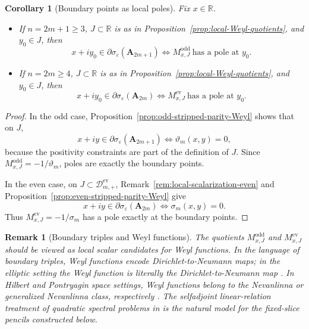 \documentclass[11pt]{article}
\newtheorem{corollary}[theorem]{Corollary}
\newtheorem{remark}[theorem]{Remark}
\begin{document}
\begin{corollary}[Boundary points as local poles]\label{cor:boundary-poles}
Fix \(x\in\mathbb{R}\).

\begin{itemize}
\item If \(n=2m+1\ge 3\), \(J\subset\mathbb R\) is as in Proposition~\ref{prop:local-Weyl-quotients},
and \(y_0\in J\), then
\[
x+iy_0\in \partial\sigma_\varepsilon(\mathbf A_{2m+1})
\iff
M^{\mathrm{odd}}_{x,J}\ \text{has a pole at } y_0.
\]

\item If \(n=2m\ge 4\), \(J\subset\mathbb R\) is as in Proposition~\ref{prop:local-Weyl-quotients},
and \(y_0\in J\), then
\[
x+iy_0\in \partial\sigma_\varepsilon(\mathbf A_{2m})
\iff
M^{\mathrm{ev}}_{x,J}\ \text{has a pole at } y_0.
\]
\end{itemize}
\end{corollary}

\begin{proof}
In the odd case, Proposition~\ref{prop:odd-stripped-parity-Weyl} shows that on \(J\),
\[
x+iy\in \partial\sigma_\varepsilon(\mathbf A_{2m+1})
\iff
\vartheta_m(x,y)=0,
\]
because the positivity constraints are part of the definition of \(J\). Since
\(M^{\mathrm{odd}}_{x,J}=-1/\vartheta_m\), poles are exactly the boundary points.

In the even case, on \(J\subset \mathcal D_{m,+}^{\mathrm{ev}}\), Remark~\ref{rem:local-scalarization-even}
and Proposition~\ref{prop:even-stripped-parity-Weyl} give
\[
x+iy\in \partial\sigma_\varepsilon(\mathbf A_{2m})
\iff
\sigma_m(x,y)=0.
\]
Thus \(M^{\mathrm{ev}}_{x,J}=-1/\sigma_m\) has a pole exactly at the boundary points.
\end{proof}

\begin{remark}[Boundary triples and Weyl functions]\label{rem:boundary-triple-Weyl}
The quotients \(M^{\mathrm{odd}}_{x,J}\) and \(M^{\mathrm{ev}}_{x,J}\) should be viewed as local scalar
candidates for Weyl functions. In the language of boundary triples, Weyl functions encode
Dirichlet-to-Neumann maps; in the elliptic setting the Weyl function is literally the
Dirichlet-to-Neumann map \cite{BehrndtLanger2007}. In Hilbert and Pontryagin space settings,
Weyl functions belong to the Nevanlinna or generalized Nevanlinna class, respectively
\cite{BehrndtDerkachHassiSnoo2011}. The selfadjoint linear-relation treatment of quadratic
spectral problems in \cite{EckhardtKostenko2017} is the natural model for the fixed-slice
pencils constructed below.
\end{remark}
\end{document}
